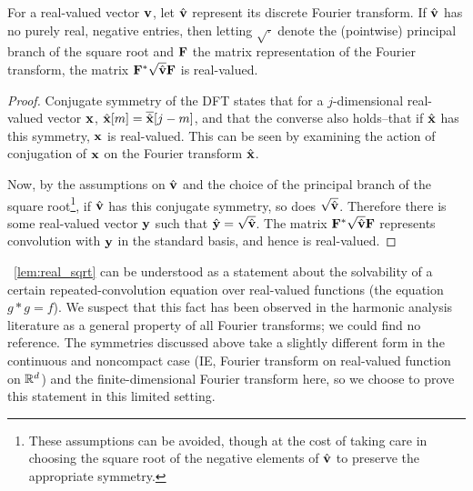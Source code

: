 \begin{lem}\label{lem:real_sqrt}
For a real-valued vector $\mathbf{v}$, let $\hat{\mathbf{v}}$ represent its discrete Fourier transform. If $\hat{\mathbf{v}}$ has no purely real, negative entries, then letting $\sqrt{\cdot}$ denote the (pointwise) principal branch of the square root and $\mathbf{F}$ the matrix representation of the Fourier transform, the matrix $\mathbf{F}^* \sqrt{\hat{\mathbf{v}}} \mathbf{F}$ is real-valued.
\end{lem}

\begin{proof}
Conjugate symmetry of the DFT states that for a $j$-dimensional real-valued vector $\mathbf{x}$, $\hat{\mathbf{x}}[m] = \overline{\hat{\mathbf{x}}}[j-m]$, and that the converse also holds--that if $\hat{\mathbf{x}}$ has this symmetry, $\mathbf{x}$ is real-valued. This can be seen by examining the action of conjugation of $\mathbf{x}$ on the Fourier transform $\hat{\mathbf{x}}$.

Now, by the assumptions on $\hat{\mathbf{v}}$ and the choice of the principal branch of the square root\footnote{These assumptions can be avoided, though at the cost of taking care in choosing the square root of the negative elements of $\hat{\mathbf{v}}$ to preserve the appropriate symmetry.}, if $\hat{\mathbf{v}}$ has this conjugate symmetry, so does $\sqrt{\hat{\mathbf{v}}}$. Therefore there is some real-valued vector $\mathbf{y}$ such that $\hat{\mathbf{y}} = \sqrt{\hat{\mathbf{v}}}$. The matrix $\mathbf{F}^* \sqrt{\hat{\mathbf{v}}} \mathbf{F}$ represents convolution with $\mathbf{y}$ in the standard basis, and hence is real-valued.
\end{proof}

 ~\cref{lem:real_sqrt} can be understood as a statement about the solvability of a certain repeated-convolution equation over real-valued functions (the equation $g * g = f$). We suspect that this fact has been observed in the harmonic analysis literature as a general property of all Fourier transforms; we could find no reference. The symmetries discussed above take a slightly different form in the continuous and noncompact case (IE, Fourier transform on real-valued function on $\mathbb{R}^d$) and the finite-dimensional Fourier transform here, so we choose to prove this statement in this limited setting.